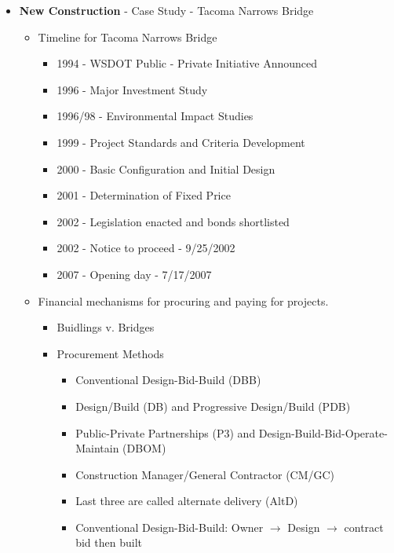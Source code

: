 \documentclass{article}
\begin{document}
\begin{itemize}
\begin{itemize}
\begin{itemize}
            \end{itemize}
        \item \textbf{New Construction} - Case Study - Tacoma Narrows Bridge
            \begin{itemize}
                \item Timeline for Tacoma Narrows Bridge
                \begin{itemize}
                    \item 1994 - WSDOT Public - Private Initiative Announced
                    \item 1996 - Major Investment Study
                    \item 1996/98 - Environmental Impact Studies
                    \item 1999 - Project Standards and Criteria Development
                    \item 2000 - Basic Configuration and Initial Design
                    \item 2001 - Determination of Fixed Price
                    \item 2002 - Legislation enacted and bonds shortlisted
                    \item 2002 - Notice to proceed - 9/25/2002
                    \item 2007 - Opening day - 7/17/2007
                \end{itemize}
                \item Financial mechanisms for procuring and paying for projects.
                \begin{itemize}
                    \item Buidlings v. Bridges
                    \item Procurement Methods
                    \begin{itemize}
                        \item Conventional Design-Bid-Build (DBB)
                        \item Design/Build (DB) and Progressive Design/Build (PDB)
                        \item Public-Private Partnerships (P3) and Design-Build-Bid-Operate-Maintain (DBOM)
                        \item Construction Manager/General Contractor (CM/GC)
                        \item Last three are called alternate delivery (AltD)
                        \item Conventional Design-Bid-Build: Owner \(\rightarrow\) Design \(\rightarrow\) contract bid then built

\end{itemize}
\end{itemize}
\end{itemize}
\end{itemize}
\end{itemize}
\end{document}
